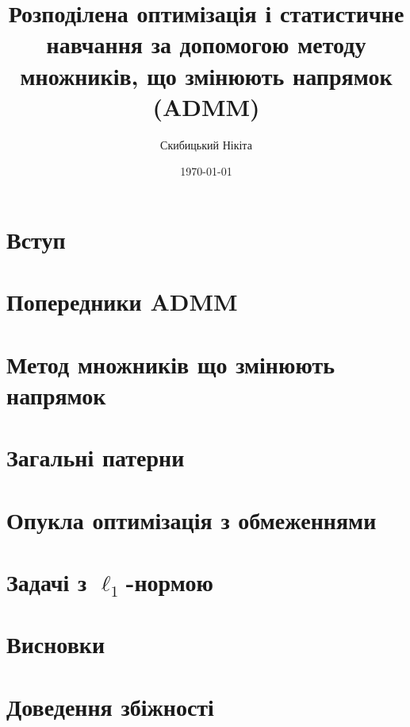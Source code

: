 \documentclass[a4paper, 12pt]{article}
\title{Розподілена оптимізація і статистичне навчання за допомогою методу множників, що змінюють напрямок (ADMM)}
\author{Скибицький Нікіта}
\date{\today}
\numberwithin{equation}{section}
\begin{document}
 
\newpage

\tableofcontents 
\newpage

\abstract{}
\newpage

\section{Вступ}
\label{section-01}

\newpage

\section{Попередники ADMM}
\label{section-02}

\newpage

\section{Метод множників що змінюють напрямок}
\label{section-03}

\newpage

\section{Загальні патерни}
\label{section-04}

\newpage

\section{Опукла оптимізація з обмеженнями}
\label{section-05}

\newpage

\section{Задачі з \texorpdfstring{$\ell_1$}{l1}-нормою}
\label{section-06}

\newpage

\section{Висновки}
\label{section-12}

\newpage

\appendix
\label{appendix-a}
\section{Доведення збіжності}

\newpage

 

\end{document}
